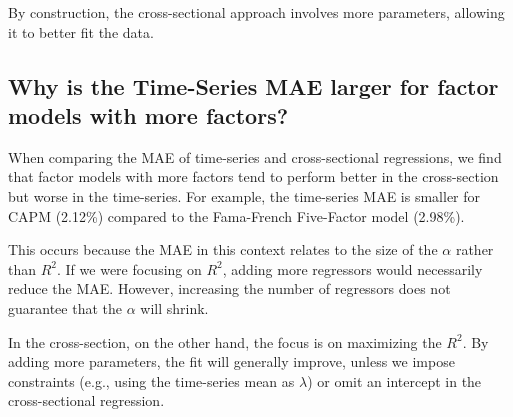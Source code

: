 \documentclass{article}
\begin{document}
By construction, the cross-sectional approach involves more parameters, allowing it to better fit the data.

\subsection{Why is the Time-Series MAE larger for factor models with more factors?}
When comparing the MAE of time-series and cross-sectional regressions, we find that factor models with more factors tend to perform better in the cross-section but worse in the time-series. For example, the time-series MAE is smaller for CAPM (2.12\%) compared to the Fama-French Five-Factor model (2.98\%).

This occurs because the MAE in this context relates to the size of the $\alpha$ rather than $R^2$. If we were focusing on $R^2$, adding more regressors would necessarily reduce the MAE. However, increasing the number of regressors does not guarantee that the $\alpha$ will shrink.

In the cross-section, on the other hand, the focus is on maximizing the $R^2$. By adding more parameters, the fit will generally improve, unless we impose constraints (e.g., using the time-series mean as $\lambda$) or omit an intercept in the cross-sectional regression.
\end{document}
